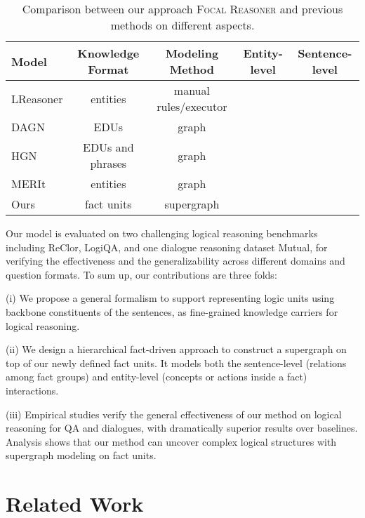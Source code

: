 \documentclass[11pt]{article}
\newcommand{\okmark}{{\textbf{\textcolor[rgb]{0.1, 0.5, 0.1}{}}}}
\newcommand{\ngmark}{{\textbf{\color{red}{\ding{55}}}}}
\begin{document}
\begin{table*}
\centering
\setlength{\belowcaptionskip}{2 pt}
\small
\setlength{\tabcolsep}{9 pt}
\begin{tabular}{lcccc}
    \toprule
    Model    & Knowledge Format & Modeling Method & Entity-level & Sentence-level\\
    \midrule
    LReasoner \cite{wang2021logic} &entities&manual rules/executor&\okmark& \ngmark \\
    DAGN \cite{zhang2021video} & EDUs & graph &\ngmark &\okmark\\
    HGN \cite{chen-etal-2022-modeling-hierarchical} & EDUs and phrases & graph & \ngmark & \okmark\\
    MERIt \cite{jiao2022merit} & entities & graph &\okmark& \ngmark \\
    \midrule
    Ours & fact units & supergraph &\okmark &\okmark \\
    \bottomrule
\end{tabular}
  \caption{Comparison between our approach \textsc{Focal Reasoner} and previous methods on different aspects.}\label{related-work}
\vspace{-5mm}
\end{table*}

Our model is evaluated on two challenging logical reasoning benchmarks including ReClor\citep{yu2020reclor}, LogiQA\citep{ijcai2020-0501}, and one dialogue reasoning dataset Mutual, for verifying the effectiveness and the generalizability across different domains and question formats. To sum up, our contributions are three folds: 

(i) We propose a general formalism to support representing logic units using backbone constituents of the sentences, as fine-grained knowledge carriers for logical reasoning. 

(ii) We design a hierarchical fact-driven approach to construct a supergraph on top of our newly defined fact units. It models both the sentence-level (relations among fact groups) and entity-level (concepts or actions inside a fact) interactions.

(iii) Empirical studies verify the general effectiveness of our method on logical reasoning for QA and dialogues, with dramatically superior results over baselines. Analysis shows that our method can uncover complex logical structures with supergraph modeling on fact units.


\section{Related Work}
\label{gen_inst}
\end{document}
